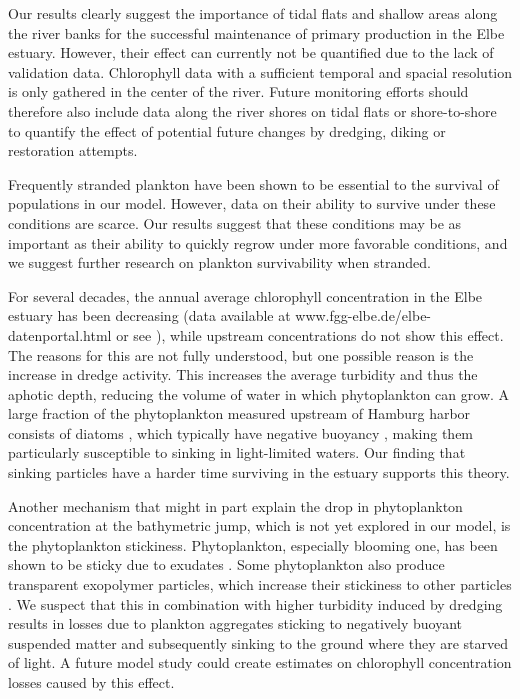 \documentclass[npg, manuscript]{copernicus}
\begin{document}
Our results clearly suggest the importance of tidal flats and shallow areas along the river banks for the successful maintenance of primary production in the Elbe estuary. 
However, their effect can currently not be quantified due to the lack of validation data.
Chlorophyll data with a sufficient temporal and spacial resolution is only gathered in the center of the river.
Future monitoring efforts should therefore also include data along the river shores on tidal flats or shore-to-shore to quantify the effect of potential future changes by dredging, diking or restoration attempts.

Frequently stranded plankton have been shown to be essential to the survival of populations in our model.
However, data on their ability to survive under these conditions are scarce.
Our results suggest that these conditions may be as important as their ability to quickly regrow under more favorable conditions, and we suggest further research on plankton survivability when stranded.

For several decades, the annual average chlorophyll concentration in the Elbe estuary has been decreasing (data available at www.fgg-elbe.de/elbe-datenportal.html or see \citep{Hardenbicker2014,Schol2014}), while upstream concentrations do not show this effect.
The reasons for this are not fully understood, but one possible reason is the increase in dredge activity.
This increases the average turbidity and thus the aphotic depth, reducing the volume of water in which phytoplankton can grow.
A large fraction of the phytoplankton measured upstream of Hamburg harbor consists of diatoms \citep{Muylaert1999}, which typically have negative buoyancy \citep{Passow1991}, making them particularly susceptible to sinking in light-limited waters.
Our finding that sinking particles have a harder time surviving in the estuary supports this theory.

Another mechanism that might in part explain the drop in phytoplankton concentration at the bathymetric jump, which is not yet explored in our model, is the phytoplankton stickiness.
Phytoplankton, especially blooming one, has been shown to be sticky due to exudates \citep{Kiørboe1993,VanderLee2000,Dutz2005}. 
Some phytoplankton also produce transparent exopolymer particles, which increase their stickiness to other particles \citep{Windler,DeBrouwer2005}.
We suspect that this in combination with  higher turbidity induced by dredging results in losses due to plankton aggregates sticking to negatively buoyant suspended matter and subsequently sinking to the ground where they are starved of light.
A future model study could create estimates on chlorophyll concentration losses caused by this effect.
\end{document}

